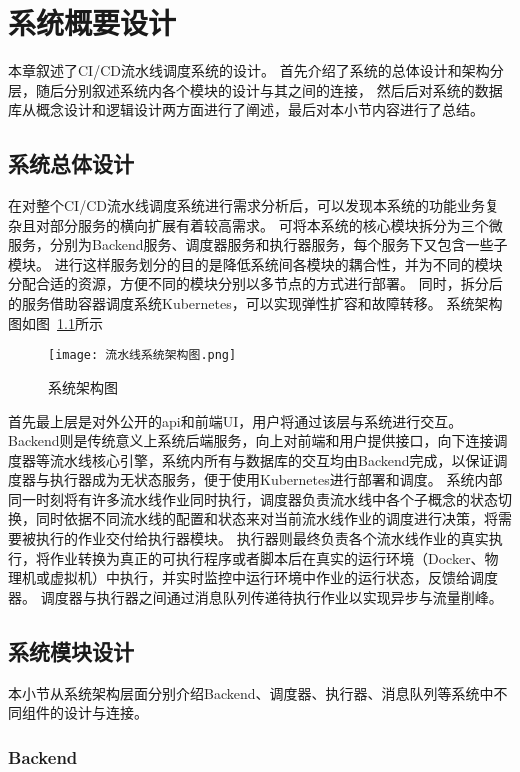 
\chapter{系统概要设计}
本章叙述了CI/CD流水线调度系统的设计。
首先介绍了系统的总体设计和架构分层，随后分别叙述系统内各个模块的设计与其之间的连接，
然后后对系统的数据库从概念设计和逻辑设计两方面进行了阐述，最后对本小节内容进行了总结。

\section{系统总体设计}

在对整个CI/CD流水线调度系统进行需求分析后，可以发现本系统的功能业务复杂且对部分服务的横向扩展有着较高需求。
可将本系统的核心模块拆分为三个微服务，分别为Backend服务、调度器服务和执行器服务，每个服务下又包含一些子模块。
进行这样服务划分的目的是降低系统间各模块的耦合性，并为不同的模块分配合适的资源，方便不同的模块分别以多节点的方式进行部署。
同时，拆分后的服务借助容器调度系统Kubernetes，可以实现弹性扩容和故障转移。
系统架构图如图~\ref{fig:系统架构图}所示

\begin{figure}[h]
  \centering
  \texttt{[image: 流水线系统架构图.png]}
  \caption{系统架构图}
  \label{fig:系统架构图}
\end{figure}

首先最上层是对外公开的api和前端UI，用户将通过该层与系统进行交互。
Backend则是传统意义上系统后端服务，向上对前端和用户提供接口，向下连接调度器等流水线核心引擎，系统内所有与数据库的交互均由Backend完成，以保证调度器与执行器成为无状态服务，便于使用Kubernetes进行部署和调度。
系统内部同一时刻将有许多流水线作业同时执行，调度器负责流水线中各个子概念的状态切换，同时依据不同流水线的配置和状态来对当前流水线作业的调度进行决策，将需要被执行的作业交付给执行器模块。
执行器则最终负责各个流水线作业的真实执行，将作业转换为真正的可执行程序或者脚本后在真实的运行环境（Docker、物理机或虚拟机）中执行，并实时监控中运行环境中作业的运行状态，反馈给调度器。
调度器与执行器之间通过消息队列传递待执行作业以实现异步与流量削峰。


\section{系统模块设计}
本小节从系统架构层面分别介绍Backend、调度器、执行器、消息队列等系统中不同组件的设计与连接。

\subsection{Backend}

